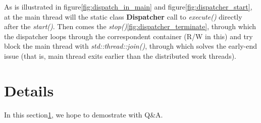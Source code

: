 \documentclass[a4paper]{article}
\begin{document}
As is illustrated in figure\ref{fig:dispatch_in_main} and figure\ref{fig:dispatcher_start},
at the main thread will the static class \textbf{Dispatcher} call to \textsl{execute()} directly
after the \textsl{start()}. Then comes the \textsl{stop()}\ref{fig:dispatcher_terminate},
through which the
dispatcher loops through the correspondent container (R/W in this) and try block the main
thread with \textsl{std::thread::join()}, through which solves the early-end issue (that
is, main thread exits earlier than the distributed work threads).

\section{Details}%
\label{sec:details}

In this section\ref{sec:details}, we hope to demostrate with Q\&A.
\end{document}
